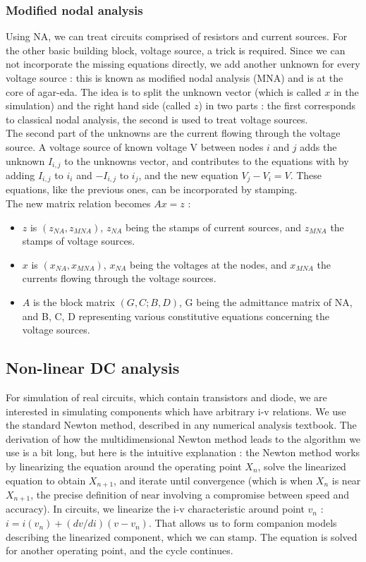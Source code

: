 \documentclass{article}
\begin{document}
\subsubsection{Modified nodal analysis}
Using NA, we can treat circuits comprised of resistors and current sources. For the other basic building block, voltage source, a trick is required. Since we can not incorporate the missing equations directly, we add another unknown for every voltage source : this is known as modified nodal analysis (MNA) and is at the core of agar-eda. The idea is to split the unknown vector (which is called $x$ in the simulation) and the right hand side (called $z$) in two parts : the first corresponds to classical nodal analysis, the second is used to treat voltage sources.\\
The second part of the unknowns are the current flowing through the voltage source. A voltage source of known voltage V between nodes $i$ and $j$ adds the unknown $I_{i,j}$ to the unknowns vector, and contributes to the equations with by adding $I_{i,j}$ to $i_i$ and $-I_{i,j}$ to $i_j$, and the new equation $V_j - V_i = V$. These equations, like the previous ones, can be incorporated by stamping.\\
The new matrix relation becomes $Ax = z$ :\\
\begin{itemize}
\item $z$ is $(z_{NA}, z_{MNA})$, $z_{NA}$ being the stamps of current sources, and $z_{MNA}$ the stamps of voltage sources. 
\item $x$ is $(x_{NA}, x_{MNA})$, $x_{NA}$ being the voltages at the nodes, and $x_{MNA}$ the currents flowing through the voltage sources.
\item $A$ is the block matrix $(G,C;B,D)$, G being the admittance matrix of NA, and B, C, D representing various constitutive equations concerning the voltage sources.
\end{itemize}
\subsection{Non-linear DC analysis}
For simulation of real circuits, which contain transistors and diode, we are interested in simulating components which have arbitrary i-v relations. We use the standard Newton method, described in any numerical analysis textbook. The derivation of how the multidimensional Newton method leads to the algorithm we use is a bit long, but here is the intuitive explanation : the Newton method works by linearizing the equation around the operating point $X_n$, solve the linearized equation to obtain $X_{n+1}$, and iterate until convergence (which is when $X_n$ is near $X_{n+1}$, the precise definition of near involving a compromise between speed and accuracy). In circuits, we linearize the i-v characteristic around point $v_n$ : $i = i(v_n) + (dv/di)(v - v_n)$. That allows us to form companion models describing the linearized component, which we can stamp. The equation is solved for another operating point, and the cycle continues.
\end{document}

